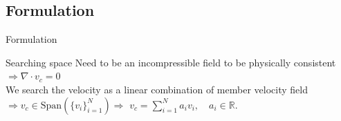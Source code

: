 \documentclass[aspectratio=169]{beamer} %
\begin{document}
\subsection{Formulation}
\begin{frame}{Formulation}

    \begin{block}{Searching space}
        Need to be an incompressible field to be physically consistent $\Rightarrow \nabla \cdot v_c = 0$ \\
        We search the velocity as a linear combination of member velocity field  \\
        $\Rightarrow v_c \in \mathrm{Span}\left(\{v_i\}_{i=1}^{N}\right) \Rightarrow$ $v_c = \sum_{i=1}^N a_i v_i, \quad a_i \in \mathbb{R}$.
    \end{block}

    \vfill
\end{frame}
\end{document}
